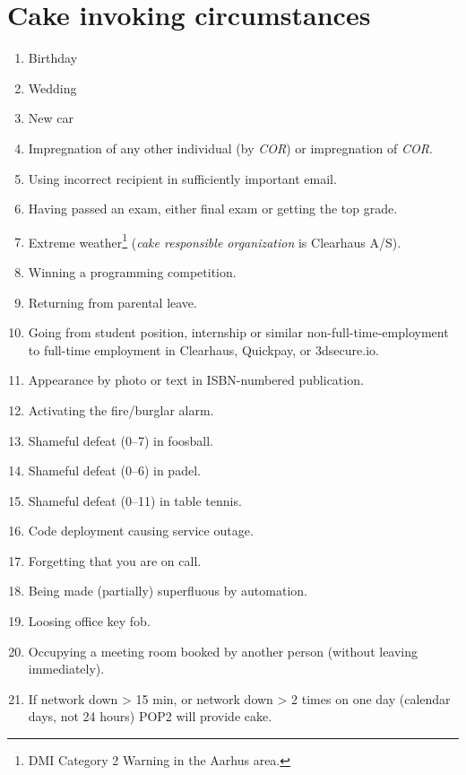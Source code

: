 \documentclass[a4paper, oneside, article]{memoir}
\newcounter{tbc}
\begin{document}
    \chapter{Cake invoking circumstances}\label{chp:circumstances}
    \begin{enumerate}[§ 1]
        \setcounter{enumi}{\value{tbc}}

        \item Birthday
        \item Wedding
        \item New car
        \item Impregnation of any other individual (by \emph{COR}) or impregnation of
        \emph{COR}.
        \item Using incorrect recipient in sufficiently important email.
        \item Having passed an exam, either final exam or getting the top grade.
        \item Extreme weather\footnote{DMI Category 2 Warning in the Aarhus area.} (\emph{cake responsible organization} is Clearhaus A/S).
        \item Winning a programming competition.
        \item Returning from parental leave.
        \item Going from student position, internship or similar non-full-time-employment to full-time employment in Clearhaus, Quickpay, or 3dsecure.io.
        \item Appearance by photo or text in ISBN-numbered publication.
        \item Activating the fire/burglar alarm.
        \item Shameful defeat (0--7) in foosball.
        \item Shameful defeat (0--6) in padel.
        \item Shameful defeat (0--11) in table tennis.
        \item Code deployment causing service outage.
        \item Forgetting that you are on call.
        \item Being made (partially) superfluous by automation.
        \item Loosing office key fob.
        \item Occupying a meeting room booked by another person (without leaving immediately).
        \item If network down > 15 min, or network down > 2 times on one day (calendar days, not 24 hours) POP2 will provide cake.
    \end{enumerate}
\end{document}
